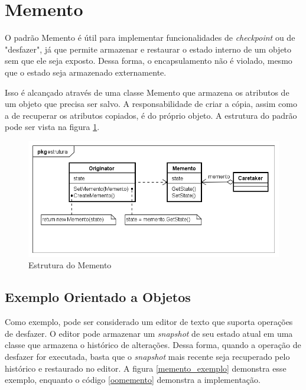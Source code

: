\section{Memento}

O padrão Memento é útil para implementar funcionalidades 
de \textit{checkpoint} ou de "desfazer", já que permite 
armazenar e restaurar o estado interno de um objeto 
sem que ele seja exposto. Dessa forma, o encapsulamento 
não é violado, mesmo que o estado seja armazenado externamente.
\cite{gamma:1995}

Isso é alcançado através de uma classe Memento que armazena os 
atributos de um objeto que precisa ser salvo. A responsabilidade 
de criar a cópia, assim como a de recuperar os atributos copiados, 
é do próprio objeto. A estrutura do padrão pode ser vista 
na figura \ref{memento_struct}.

\begin{figure}[htb]
	\caption{\label{memento_struct}Estrutura do Memento}
	\begin{center}
	    \includegraphics[scale=0.5]{5_padroes-contexto-funcional/5.3_comportamentais/5.3.06_memento/memento_estrutura.png}
	\end{center}
\end{figure}

\subsection*{Exemplo Orientado a Objetos}

Como exemplo, pode ser considerado um editor de texto que 
suporta operações de desfazer. O editor pode armazenar um 
\textit{snapshot} de seu estado atual em uma classe que 
armazena o histórico de alterações. Dessa forma, quando a 
operação de desfazer for executada, basta que o 
\textit{snapshot} mais recente seja recuperado pelo histórico 
e restaurado no editor. A figura \ref{memento_exemplo} demonstra 
esse exemplo, enquanto o código \ref{oomemento} demonstra a 
implementação.

